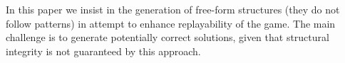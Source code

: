 \documentclass[sigconf]{acmart}
\begin{document}
In this paper we insist in the generation of free-form structures (they do not follow patterns) in attempt to enhance replayability of the game. 
The main challenge %
is to generate potentially correct solutions, given that structural integrity is not
guaranteed by this approach. 


\end{document}
